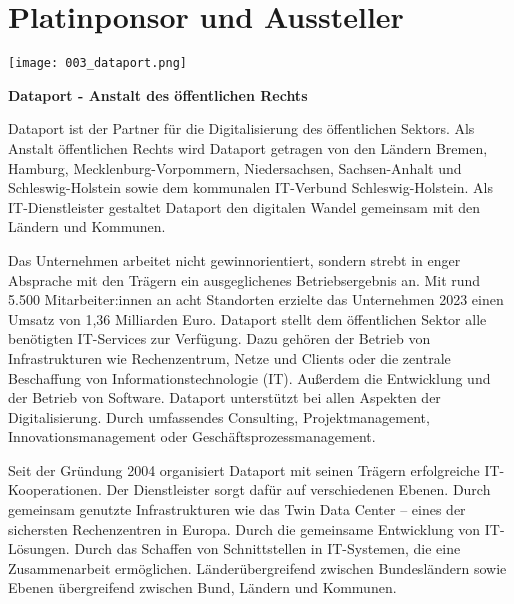 \clearpage
\section*{Platinponsor und Aussteller}
  \texttt{[image: 003\_dataport.png]}
  \vspace{1.0\baselineskip}
  
 {\footnotesize
\noindent
    {\bfseries Dataport - Anstalt des öffentlichen Rechts}
    \vspace{1.0\baselineskip}
    
\noindent
Dataport ist der Partner für die Digitalisierung des öffentlichen Sektors.
Als Anstalt öffentlichen Rechts wird Dataport getragen von den Ländern Bremen,
Hamburg, Mecklenburg-Vorpommern, Niedersachsen, Sachsen-Anhalt und
Schleswig-Holstein sowie dem kommunalen IT-Verbund Schleswig-Holstein.
Als IT-Dienst\-leister gestaltet Dataport den digitalen Wandel gemeinsam mit
den Ländern und Kommunen.

\noindent
Das Unternehmen arbeitet nicht gewinnorientiert, sondern strebt in enger
Absprache mit den Trägern ein ausgeglichenes Betriebsergebnis an.
Mit rund 5.500 Mitarbeiter:innen an acht Standorten erzielte das Unternehmen
2023 einen Umsatz von 1,36 Milliarden Euro. Dataport stellt dem öffentlichen
Sektor alle benötigten IT-Services zur Verfügung. Dazu gehören der Betrieb
von Infrastrukturen wie Rechenzentrum, Netze und Clients oder die zentrale
Beschaffung von Informationstechnologie (IT). Außerdem die Entwicklung und
der Betrieb von Software. Dataport unterstützt bei allen Aspekten der Digitalisierung.
Durch umfassendes Consulting, Projektmanagement, Innovationsmanagement
oder Geschäftsprozessmanagement.

\noindent
Seit der Gründung 2004 organisiert Dataport mit seinen Trägern erfolgreiche
IT-Kooperationen. Der Dienstleister sorgt dafür auf verschiedenen Ebenen.
Durch gemeinsam genutzte Infrastrukturen wie das Twin Data Center – eines
der sichersten Rechenzentren in Europa. Durch die gemeinsame Entwicklung
von IT-Lösungen. Durch das Schaffen von Schnittstellen in IT-Systemen, die
eine Zusammenarbeit ermöglichen. Länderübergreifend zwischen Bundesländern
sowie Ebenen übergreifend zwischen Bund, Ländern und Kommunen.
}
